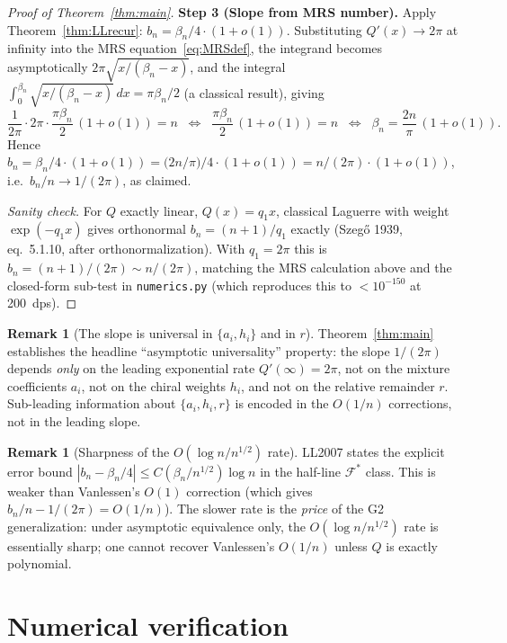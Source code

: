 \documentclass[11pt]{article}
\theoremstyle{definition}
\newtheorem{remark}[theorem]{Remark}
\begin{document}
\begin{proof}[Proof of Theorem~\ref{thm:main}]
\textbf{Step 3 (Slope from MRS number).}  Apply
Theorem~\ref{thm:LLrecur}: $b_n=\beta_n/4\cdot(1+o(1))$.  Substituting
$Q'(x)\to 2\pi$ at infinity into the MRS equation~\eqref{eq:MRSdef},
the integrand becomes asymptotically $2\pi\sqrt{x/(\beta_n-x)}$, and
the integral $\int_0^{\beta_n}\sqrt{x/(\beta_n-x)}\,dx=\pi\beta_n/2$ (a
classical result), giving
\[
   \frac{1}{2\pi}\cdot 2\pi\cdot\frac{\pi\beta_n}{2}\,(1+o(1))=n
   \;\;\Longleftrightarrow\;\;
   \frac{\pi\beta_n}{2}\,(1+o(1))=n
   \;\;\Longleftrightarrow\;\;
   \beta_n=\frac{2n}{\pi}\,(1+o(1)).
\]
Hence $b_n=\beta_n/4\cdot(1+o(1))=\bigl(2n/\pi\bigr)/4\cdot(1+o(1))=n/(2\pi)\cdot(1+o(1))$,
i.e.\ $b_n/n\to 1/(2\pi)$, as claimed.

\emph{Sanity check.}  For $Q$ exactly linear, $Q(x)=q_1 x$, classical
Laguerre with weight $\exp(-q_1 x)$ gives orthonormal $b_n=(n+1)/q_1$
exactly (Szeg\H{o} 1939, eq.~5.1.10, after orthonormalization).
With $q_1=2\pi$ this is $b_n=(n+1)/(2\pi)\sim n/(2\pi)$, matching the MRS
calculation above and the closed-form sub-test in
\texttt{numerics.py} (which reproduces this to $<10^{-150}$ at 200~dps).
\end{proof}

\begin{remark}[The slope is universal in $\{a_i, h_i\}$ and in $r$]
\label{rem:universal}
Theorem~\ref{thm:main} establishes the headline ``asymptotic universality''
property: the slope $1/(2\pi)$ depends \emph{only} on the leading
exponential rate $Q'(\infty)=2\pi$, not on the mixture coefficients $a_i$,
not on the chiral weights $h_i$, and not on the relative remainder $r$.
Sub-leading information about $\{a_i,h_i,r\}$ is encoded in the $O(1/n)$
corrections, not in the leading slope.
\end{remark}

\begin{remark}[Sharpness of the $O(\log n / n^{1/2})$ rate]\label{rem:rate}
LL2007 \cite[Thm.\ 1.1]{LL2007} states the explicit error bound
$|b_n-\beta_n/4|\le C(\beta_n/n^{1/2})\log n$ in the half-line
$\mathcal{F}^*$ class.  This is weaker than Vanlessen's $O(1)$ correction
(which gives $b_n/n - 1/(2\pi)=O(1/n)$).  The slower rate is the
\emph{price} of the G2 generalization: under asymptotic equivalence
only, the $O(\log n/n^{1/2})$ rate is essentially sharp; one cannot
recover Vanlessen's $O(1/n)$ unless $Q$ is exactly polynomial.
\end{remark}

\section{Numerical verification}\label{sec:numerics}
\end{document}
